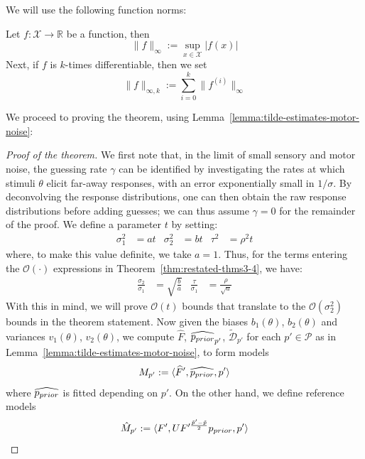 We will use the following function norms:
\begin{defin}\label{def:function-norms}
Let $f : \mathcal{X} \rightarrow \mathbb{R}$ be a function, then
\begin{equation}
    \|f\|_\infty := \sup_{x \in \mathcal{X}} |f(x)|
\end{equation}
Next, if $f$ is $k$-times differentiable, then we set
\begin{equation}
    \|f\|_{\infty, k} := \sum_{i=0}^k \|f^{(i)}\|_\infty
\end{equation}
\end{defin}
We proceed to proving the theorem, using Lemma~\ref{lemma:tilde-estimates-motor-noise}:
\begin{proof}[Proof of the theorem]
We first note that, in the limit of small sensory and motor noise, the guessing rate $\gamma$ can be identified by investigating the rates at which stimuli $\theta$ elicit far-away responses, with an error exponentially small in $1/\sigma$. 
By deconvolving the response distributions, one can then obtain the raw response distributions before adding guesses; we can thus assume $\gamma=0$ for the remainder of the proof.
We define a parameter $t$ by setting:
\begin{align*}
    \sigma_1^2 &= at &
    \sigma_2^2 &= bt &
    \tau^2 &= \rho^2 t
\end{align*}
where, to make this value definite, we take $a=1$.
Thus, for the terms entering the $\mathcal{O}(\cdot)$ expressions in Theorem~\ref{thm:restated-thms3-4}, we have:
\begin{align*}
\frac{\sigma_2}{\sigma_1} &= \sqrt{\frac{b}{a}} &
\frac{\tau}{\sigma_1} &= \frac{\rho}{\sqrt{a}}
\end{align*}
With this in mind, we will prove $\mathcal{O}(t)$ bounds that translate to the $\mathcal{O}(\sigma_2^2)$ bounds in the theorem statement.
Now given the biases $b_1(\theta)$, $b_2(\theta)$ and variances $v_1(\theta)$, $v_2(\theta)$, we compute $\widehat{F}$, $\widehat{p_{prior}}_{p'}$, $\tilde{\mathcal{D}}_{p'}$ for each $p' \in \mathcal{P}$ as in Lemma~\ref{lemma:tilde-estimates-motor-noise}, to form models 
\begin{equation}
M_{p'} := \langle \widehat{F}', \widehat{p_{prior}}, p'\rangle    
\end{equation}
where $\widehat{p_{prior}}$ is fitted depending on $p'$.
On the other hand, we define reference models
\begin{equation}
    \hat{M}_{p'} := \langle F', U F'^{\frac{\tilde{p}'-\tilde{p}}{2}} \Prior, p'\rangle

\end{equation}
\end{proof}
